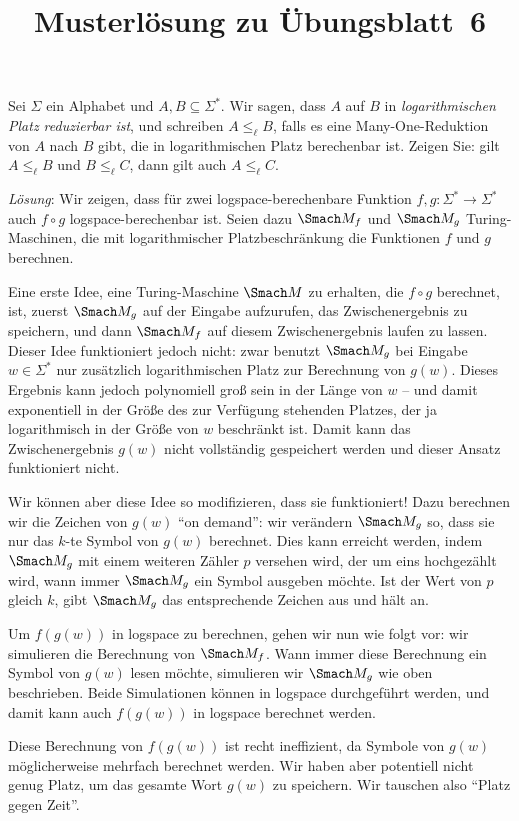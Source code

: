 \documentclass[german]{latteachCD}[2017/03/28]
\title{Musterlösung zu Übungsblatt~6}
\begin{document}
\maketitle

\vspace*{0.5\baselineskip}
\setcounter{exercise}{2}
\justifying

\begin{exercise}
  Sei $\Sigma$ ein Alphabet und $A, B \subseteq \Sigma^{*}$.  Wir sagen, dass
  $A$ auf $B$ in \emph{logarithmischen Platz reduzierbar ist}, und schreiben $A
  \leq_{\ell} B$, falls es eine Many-One-Reduktion von $A$ nach $B$ gibt, die in
  logarithmischen Platz berechenbar ist.  Zeigen Sie: gilt $A \leq_{\ell} B$ und
  $B \leq_{\ell} C$, dann gilt auch $A \leq_{\ell} C$.
\end{exercise}

\emph{Lösung}\/: Wir zeigen, dass für zwei logspace-berechenbare Funktion $f,
g\colon \Sigma^{*} \to \Sigma^{*}$ auch $f \circ g$ logspace-berechenbar ist.
Seien dazu $\Smach M_{f}$ und $\Smach M_{g}$ Turing-Maschinen, die mit
logarithmischer Platzbeschränkung die Funktionen $f$ und $g$ berechnen.

Eine erste Idee, eine Turing-Maschine $\Smach M$ zu erhalten, die $f \circ g$
berechnet, ist, zuerst $\Smach M_{g}$ auf der Eingabe aufzurufen, das
Zwischenergebnis zu speichern, und dann $\Smach M_{f}$ auf diesem
Zwischenergebnis laufen zu lassen.  Dieser Idee funktioniert jedoch nicht: zwar
benutzt $\Smach M_{g}$ bei Eingabe $w \in \Sigma^{*}$ nur zusätzlich
logarithmischen Platz zur Berechnung von $g(w)$.  Dieses Ergebnis kann jedoch
polynomiell groß sein in der Länge von $w$ -- und damit exponentiell in der
Größe des zur Verfügung stehenden Platzes, der ja logarithmisch in der Größe von
$w$ beschränkt ist.  Damit kann das Zwischenergebnis $g(w)$ nicht vollständig
gespeichert werden und dieser Ansatz funktioniert nicht.

Wir können aber diese Idee so modifizieren, dass sie funktioniert!  Dazu
berechnen wir die Zeichen von $g(w)$ \enquote{on demand}: wir verändern $\Smach
M_{g}$ so, dass sie nur das $k$-te Symbol von $g(w)$ berechnet.  Dies kann
erreicht werden, indem $\Smach M_{g}$ mit einem weiteren Zähler $p$ versehen
wird, der um eins hochgezählt wird, wann immer $\Smach M_{g}$ ein Symbol
ausgeben möchte.  Ist der Wert von $p$ gleich $k$, gibt $\Smach M_{g}$ das
entsprechende Zeichen aus und hält an.

Um $f(g(w))$ in logspace zu berechnen, gehen wir nun wie folgt vor: wir
simulieren die Berechnung von $\Smach M_{f}$.  Wann immer diese Berechnung ein
Symbol von $g(w)$ lesen möchte, simulieren wir $\Smach M_{g}$ wie oben
beschrieben.  Beide Simulationen können in logspace durchgeführt werden, und
damit kann auch $f(g(w))$ in logspace berechnet werden.

Diese Berechnung von $f(g(w))$ ist recht ineffizient, da Symbole von $g(w)$
möglicherweise mehrfach berechnet werden.  Wir haben aber potentiell nicht genug
Platz, um das gesamte Wort $g(w)$ zu speichern.  Wir tauschen also
\enquote{Platz gegen Zeit}.
\end{document}
